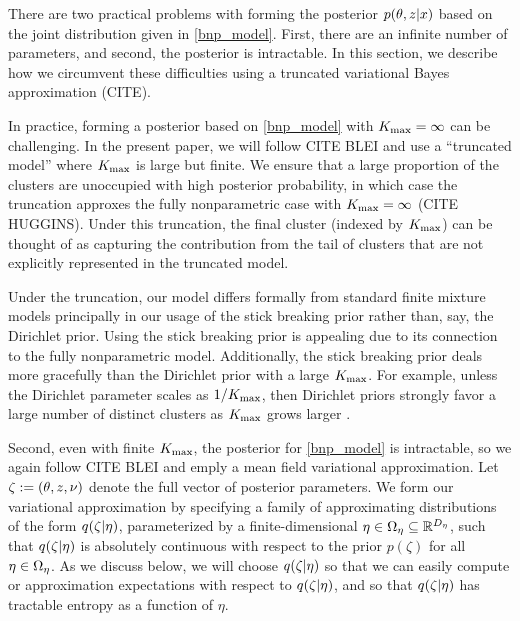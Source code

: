 There are two practical problems with forming the posterior
$p(\theta, z \vert x)$ based on the joint distribution given in
\eqref{bnp_model}.  First, there are an infinite number of parameters,
and second, the posterior is intractable.  In this section, we describe
how we circumvent these difficulties using a truncated variational Bayes
approximation (CITE).

In practice, forming a posterior based on \eqref{bnp_model} with ${K_{\mathrm{max}}} =
\infty$ can be challenging.  In the present paper, we will follow CITE BLEI and
use a ``truncated model'' where ${K_{\mathrm{max}}}$ is large but finite. We ensure that a
large proportion of the clusters are unoccupied with high posterior probability,
in which case the truncation approxes the fully nonparametric case with ${K_{\mathrm{max}}} =
\infty$ (CITE HUGGINS).  Under this truncation, the final cluster (indexed by
${K_{\mathrm{max}}}$) can be thought of as capturing the contribution from the tail of
clusters that are not explicitly represented in the truncated model.

Under the truncation, our model differs formally from standard finite mixture
models principally in our usage of the stick breaking prior rather than, say,
the Dirichlet prior.  Using the stick breaking prior is appealing due to its
connection to the fully nonparametric model.  Additionally, the stick breaking
prior deals more gracefully than the Dirichlet prior with a large ${K_{\mathrm{max}}}$.  For
example, unless the Dirichlet parameter scales as $1 / {K_{\mathrm{max}}}$, then Dirichlet
priors strongly favor a large number of  distinct clusters as ${K_{\mathrm{max}}}$ grows
larger \citep[Problem 3]{stanford:2014:bnphw}.

Second, even with finite ${K_{\mathrm{max}}}$, the posterior for \eqref{bnp_model} is
intractable, so we again follow CITE BLEI and emply a mean field variational
approximation.  Let $\zeta := (\theta, z, \nu)$ denote the full vector of
posterior parameters.  We form our variational approximation by specifying a
family of approximating distributions of the form $q(\zeta \vert \eta)$,
parameterized by a finite-dimensional $\eta \in \Omega_{\eta} \subseteq
\mathbb{R}^{{D_{\eta}}}$, such that $q(\zeta \vert \eta)$ is absolutely continuous
with respect to the prior $p(\zeta)$ for all $\eta \in \Omega_{\eta}$.  As we discuss
below, we will choose $q(\zeta \vert \eta)$ so that we can easily compute or
approximation expectations with respect to $q(\zeta \vert \eta)$, and so that
$q(\zeta \vert \eta)$ has tractable entropy as a function of $\eta$.

